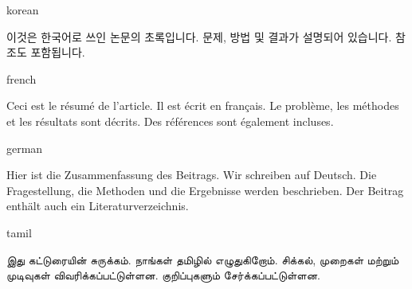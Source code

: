 \documentclass[colorlinks,nofoot,spanish,japanese,russian,greek,ukrainian,vietnamese,french,portuguese,turkish,polish,indonesian,italian,german,latin,serbianc,bidi=basic]{asmeconf}
\begin{document}
\begin{selectlanguage}{korean}
\begin{abstract*}
이것은 한국어로 쓰인 논문의 초록입니다. 문제, 방법 및 결과가 설명되어 있습니다. 참조도 포함됩니다.
\end{abstract*}
\end{selectlanguage}%

{\NotoSerif
\begin{selectlanguage}{french}
\begin{abstract*}
Ceci est le résumé de l'article. Il est écrit en français. Le problème, les méthodes et les résultats sont décrits. Des références sont également incluses.
\end{abstract*}
\end{selectlanguage}%

\begin{selectlanguage}{german}
\begin{abstract*}
Hier ist die Zusammenfassung des Beitrags. Wir schreiben auf Deutsch. Die Fragestellung, die Methoden und die Ergebnisse werden beschrieben. Der Beitrag enthält auch ein Literaturverzeichnis.
\end{abstract*}
\end{selectlanguage}%
}%

\begin{selectlanguage}{tamil}
\begin{abstract*}
 இது கட்டுரையின் சுருக்கம். நாங்கள் தமிழில் எழுதுகிறோம். சிக்கல், முறைகள் மற்றும் முடிவுகள் விவரிக்கப்பட்டுள்ளன. குறிப்புகளும் சேர்க்கப்பட்டுள்ளன.
\end{abstract*}
\end{selectlanguage}%
\end{document}

